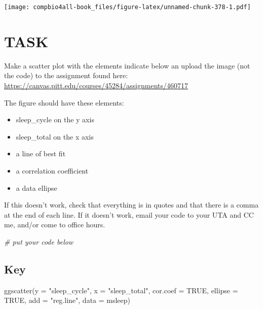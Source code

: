 \documentclass[
]{book}
\newenvironment{Shaded}{\begin{snugshade}}{\end{snugshade}}
\newcommand{\AttributeTok}[1]{\textcolor[rgb]{0.77,0.63,0.00}{#1}}
\newcommand{\CommentTok}[1]{\textcolor[rgb]{0.56,0.35,0.01}{\textit{#1}}}
\newcommand{\ConstantTok}[1]{\textcolor[rgb]{0.00,0.00,0.00}{#1}}
\newcommand{\FunctionTok}[1]{\textcolor[rgb]{0.00,0.00,0.00}{#1}}
\newcommand{\NormalTok}[1]{#1}
\newcommand{\StringTok}[1]{\textcolor[rgb]{0.31,0.60,0.02}{#1}}
\providecommand{\tightlist}{%
  \setlength{\itemsep}{0pt}\setlength{\parskip}{0pt}}
\begin{document}
\texttt{[image: compbio4all-book\_files/figure-latex/unnamed-chunk-378-1.pdf]}

\hypertarget{task-2}{%
\section{TASK}\label{task-2}}

Make a scatter plot with the elements indicate below an upload the image (not the code) to the assignment found here:
\url{https://canvas.pitt.edu/courses/45284/assignments/460717}

The figure should have these elements:

\begin{itemize}
\tightlist
\item
  sleep\_cycle on the y axis
\item
  sleep\_total on the x axis
\item
  a line of best fit
\item
  a correlation coefficient
\item
  a data ellipse
\end{itemize}

If this doesn't work, check that everything is in quotes and that there is a comma at the end of each line. If it doesn't work, email your code to your UTA and CC me, and/or come to office hours.

\begin{Shaded}
\begin{Highlighting}[]
\CommentTok{\# put your code below}
\end{Highlighting}
\end{Shaded}

\hypertarget{key}{%
\subsection{Key}\label{key}}

\begin{Shaded}
\begin{Highlighting}[]
\FunctionTok{ggscatter}\NormalTok{(}\AttributeTok{y =} \StringTok{"sleep\_cycle"}\NormalTok{,}
          \AttributeTok{x =} \StringTok{"sleep\_total"}\NormalTok{,}
          \AttributeTok{cor.coef =} \ConstantTok{TRUE}\NormalTok{,}
          \AttributeTok{ellipse =} \ConstantTok{TRUE}\NormalTok{,}
          \AttributeTok{add =} \StringTok{"reg.line"}\NormalTok{,}
          \AttributeTok{data =}\NormalTok{ msleep)}
\end{Highlighting}
\end{Shaded}
\end{document}
